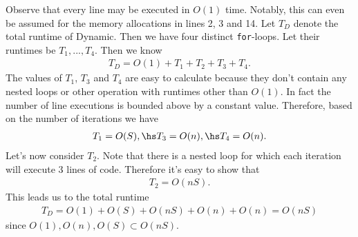 \documentclass{article}
\begin{document}
Observe that every line may be executed in $O(1)$ time. Notably, this
can even be assumed for the memory allocations in lines 2, 3 and 14.
Let $T_D$ denote the total runtime of Dynamic. 
Then we have four distinct \texttt{for}-loops. Let their runtimes be 
$T_1, ..., T_4$. Then we know
\begin{align*}
    T_D = O(1) + T_1 + T_2 + T_3 + T_4.
\end{align*}
The values of $T_1$, $T_3$ and $T_4$ are easy to calculate because
they don't contain any nested loops or other operation with runtimes
other than $O(1)$. In fact the number of line executions is bounded
above by a constant value. Therefore, based on the number of
iterations we have
\begin{align*}
    T_1 = O(S),\hs T_3 = O(n),\hs T_4 = O(n).
\end{align*}
Let's now consider $T_2$. Note that there is a nested loop for which
each iteration will execute 3 lines of code. Therefore it's easy to show that
\begin{align*}
    T_2 = O(nS).
\end{align*}
This leads us to the total runtime
\begin{align*}
    T_D = O(1) + O(S) + O(nS) + O(n) + O(n) = O(nS)
\end{align*}
since $O(1),O(n),O(S)\subset O(nS)$.
\end{document}
